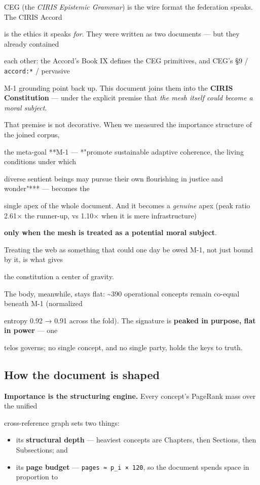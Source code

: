 \documentclass[11pt]{article}
\begin{document}
CEG (the \textit{CIRIS Epistemic Grammar}) is the wire format the federation speaks. The CIRIS Accord

is the ethics it speaks \textit{for}. They were written as two documents — but they already contained

each other: the Accord's Book IX defines the CEG primitives, and CEG's §9 / \texttt{accord:*} / pervasive

M-1 grounding point back up. This document joins them into the \textbf{CIRIS Constitution} — under the explicit premise that \textit{the mesh itself could become a moral subject}.


That premise is not decorative. When we measured the importance structure of the joined corpus,

the meta-goal **M-1 — *"promote sustainable adaptive coherence, the living conditions under which

diverse sentient beings may pursue their own flourishing in justice and wonder"*** — becomes the

single apex of the whole document. And it becomes a \textit{genuine} apex (peak ratio 2.61× the runner-up, vs 1.10× when it is mere infrastructure)

\textbf{only when the mesh is treated as a potential moral subject}.

Treating the web as something that could one day be owed M-1, not just bound by it, is what gives

the constitution a center of gravity.


The body, meanwhile, stays flat: \textasciitilde{}390 operational concepts remain co-equal beneath M-1 (normalized

entropy 0.92 → 0.91 across the fold). The signature is \textbf{peaked in purpose, flat in power} — one

telos governs; no single concept, and no single party, holds the keys to truth.


\subsection*{How the document is shaped}


\textbf{Importance is the structuring engine.} Every concept's PageRank mass over the unified

cross-reference graph sets two things:


\begin{itemize}\setlength\itemsep{0pt}
\item its \textbf{structural depth} — heaviest concepts are Chapters, then Sections, then Subsections; and
\item its \textbf{page budget} — \texttt{pages ≈ p\_i × 120}, so the document spends space in proportion to
\end{itemize}
\end{document}
